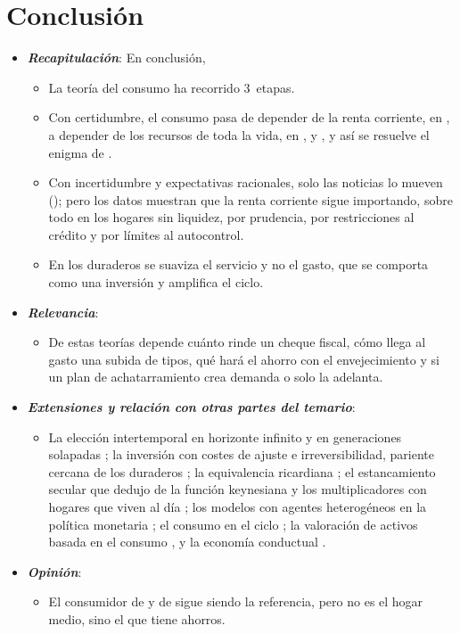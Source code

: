 \documentclass[11pt]{article}
\begin{document}
\section*{Conclusión}

\begin{itemize}
\item \textbf{\emph{Recapitulación}}: En conclusión,
  \begin{itemize}
  \item La teoría del consumo ha recorrido 3~etapas.
  \item Con certidumbre, el consumo pasa de depender de la renta corriente, en , a depender de los recursos de toda la vida, en ,  y , y así se resuelve el enigma de .
  \item Con incertidumbre y expectativas racionales, solo las noticias lo mueven (); pero los datos muestran que la renta corriente sigue importando, sobre todo en los hogares sin liquidez, por prudencia, por restricciones al crédito y por límites al autocontrol.
  \item En los duraderos se suaviza el servicio y no el gasto, que se comporta como una inversión y amplifica el ciclo.
  \end{itemize}
\item \textbf{\emph{Relevancia}}:
  \begin{itemize}
  \item De estas teorías depende cuánto rinde un cheque fiscal, cómo llega al gasto una subida de tipos, qué hará el ahorro con el envejecimiento y si un plan de achatarramiento crea demanda o solo la adelanta.
  \end{itemize}
\item \textbf{\emph{Extensiones y relación con otras partes del temario}}:
  \begin{itemize}
  \item La elección intertemporal en horizonte infinito y en generaciones solapadas ; la inversión con costes de ajuste e irreversibilidad, pariente cercana de los duraderos ; la equivalencia ricardiana ; el estancamiento secular que  dedujo de la función keynesiana y los multiplicadores con hogares que viven al día ; los modelos con agentes heterogéneos en la política monetaria ; el consumo en el ciclo ; la valoración de activos basada en el consumo , y la economía conductual .
  \end{itemize}
\item \textbf{\emph{Opinión}}:
  \begin{itemize}
  \item El consumidor de  y de  sigue siendo la referencia, pero no es el hogar medio, sino el que tiene ahorros.


\end{itemize}
\end{itemize}
\end{document}
